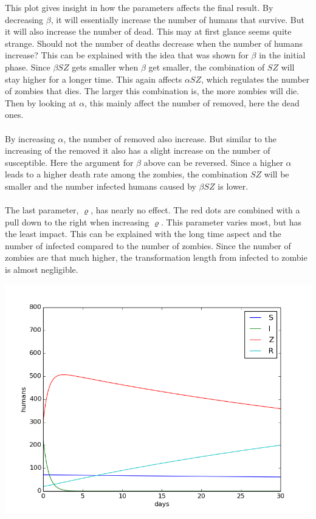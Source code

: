 \documentclass[%
twoside,                 %
final,                   %
10pt]{article}
\begin{document}
This plot gives insight in how the parameters affects the final result. By decreasing $\beta$, it will essentially increase the number of humans that survive. But it will also increase the number of dead. This may at first glance seems quite strange. Should not the number of deaths decrease when the number of humans increase? This can be explained with the idea that was shown for $\beta$ in the initial phase. Since $\beta SZ$ gets smaller when $\beta$ get smaller, the combination of $SZ$ will stay higher for a longer time. This again affects $\alpha SZ$, which regulates the number of zombies that dies. The larger this combination is, the more zombies will die. Then by looking at $\alpha$, this mainly affect the number of removed, here the dead ones.
\\
\\
By increasing $\alpha$, the number of removed also increase. But similar to the increasing of the removed it also has a slight increase on the number of susceptible. Here the argument for $\beta$ above can be reversed. Since a higher $\alpha$ leads to a higher death rate among the zombies, the combination $SZ$ will be smaller and the number infected humans caused by $\beta SZ$ is lower.     
\\
\\
The last parameter, $\varrho$, has nearly no effect. The red dots are combined with a pull down to the right when increasing $\varrho$. This parameter varies most, but has the least impact. This can be explained with the long time aspect and the number of infected compared to the number of zombies. Since the number of zombies are that much higher, the transformation length from infected to zombie is almost negligible.  


\begin{center}  %
  \centerline{\includegraphics[width=0.9\linewidth]{plots/WD_zombie_hysterical_1.png}}
\end{center}
\end{document}
